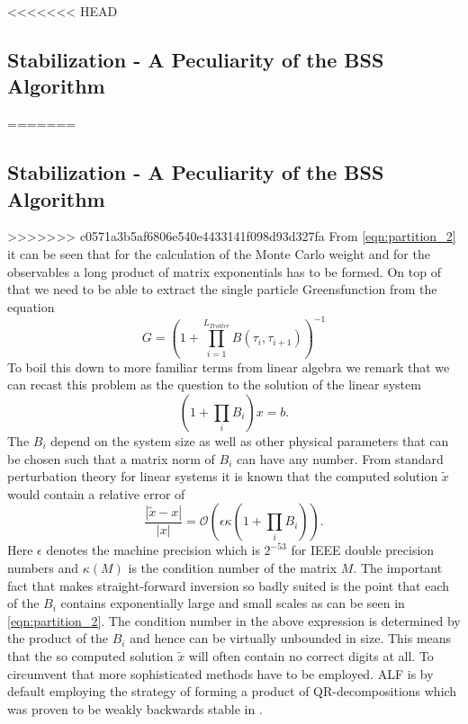 <<<<<<< HEAD

\subsection{Stabilization - A Peculiarity of the BSS Algorithm}
=======
\subsection{Stabilization - A Peculiarity of the BSS Algorithm}\label{sec:stable}
>>>>>>> c0571a3b5af6806e540e4433141f098d93d327fa
From \eqref{eqn:partition_2} it can be seen that for the calculation of the Monte Carlo weight
and for the observables a long product of matrix exponentials has to be formed.
On top of that we need to be able to extract the single particle Greensfunction from 
the equation 
\begin{equation}
G = \left( 1 + \prod_{i = 1}^{L_{Trotter}} B(\tau_i, \tau_{i+1})\right)^{-1}
\end{equation}
To boil this down to more familiar terms from linear algebra we remark that we can recast this problem as the question to the solution of the linear system
\begin{equation}
(1 + \prod_i B_i) x = b.
\end{equation}
The $B_i$ depend on the system size as well as other physical parameters that can be chosen such that a matrix norm of $B_i$ can have any number.
From standard perturbation theory for linear systems it is known that the computed solution $\tilde{x}$ would 
contain a relative error of
\begin{equation}
\frac{|\tilde{x} - x|}{|x|} = \mathcal{O}\left(\epsilon \kappa(1 + \prod_i B_i)\right).
\end{equation}
Here $\epsilon$ denotes the machine precision which is $2^{-53}$ for IEEE double precision numbers
and $\kappa(M)$ is the condition number of the matrix $M$.
The important fact that makes straight-forward inversion so badly suited is the point that
each of the $B_i$ contains exponentially large and small scales as can be seen in \eqref{eqn:partition_2}.
The condition number in the above expression is determined by the product of the $B_i$
and hence can be virtually unbounded in size. This means that the so computed solution $\tilde{x}$
will often contain no correct digits at all.
To circumvent that more sophisticated methods have to be employed. ALF is by default employing
the strategy of forming a product of QR-decompositions which was proven to be weakly backwards stable in \cite{Bai2011}.
